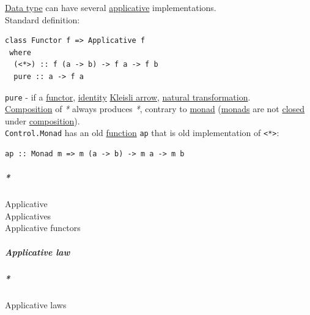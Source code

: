\documentclass[11pt]{article}
\begin{document}
\hyperref[org212d9c3]{Data type} can have several \hyperref[org2dfdf4a]{applicative} implementations.\\

Standard definition:\\
\begin{verbatim}
class Functor f => Applicative f
 where
  (<*>) :: f (a -> b) -> f a -> f b
  pure :: a -> f a
\end{verbatim}

\texttt{pure} - if a \hyperref[orgf2f6841]{functor}, \hyperref[org9b95fd5]{identity} \hyperref[org12f613d]{Kleisli arrow}, \hyperref[orgc8e9bc9]{natural transformation}.\\

\hyperref[orga128e7f]{Composition} of \emph{*} always produces \emph{*}, contrary to \hyperref[org86a5d95]{monad} (\hyperref[org0d4a4ef]{monads} are not \hyperref[orgcdd7006]{closed} under \hyperref[orga128e7f]{composition}).\\

\texttt{Control.Monad} has an old \hyperref[orge15bc14]{function} \texttt{ap} that is old implementation of \texttt{<*>}:\\
\begin{verbatim}
ap :: Monad m => m (a -> b) -> m a -> m b
\end{verbatim}

\subparagraph{\emph{*}}
\label{sec:org98d9096}

\label{org2dfdf4a}Applicative\\
\label{org11fa8ed}Applicatives\\
\label{org20de6ad}Applicative functors\\

\subparagraph{\label{org394de6b}Applicative law}
\label{sec:org4fceb64}

\subparagraph{\emph{*}}
\label{sec:orgb1b73fa}
\label{org137ab57}Applicative laws\\
\end{document}

